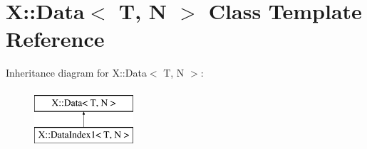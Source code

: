 \hypertarget{class_x_1_1_data}{\section{X\-:\-:Data$<$ T, N $>$ Class Template Reference}
\label{class_x_1_1_data}
}
Inheritance diagram for X\-:\-:Data$<$ T, N $>$\-:\begin{figure}[H]
\begin{center}
\leavevmode
\includegraphics[height=2.000000cm]{class_x_1_1_data}
\end{center}
\end{figure}
